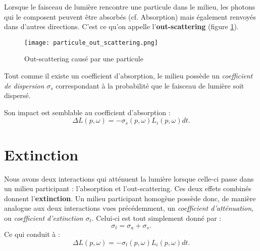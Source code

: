 Lorsque le faisceau de lumière rencontre une particule dans le milieu, les photons qui le composent peuvent être absorbés (cf. Absorption) mais également renvoyés dans d'autres directions. C'est ce qu'on appelle l'\textbf{out-scattering} (figure \ref{fig:out_scattering}).

\begin{figure}[h!]\label{fig:out_scattering}
\centering
\texttt{[image: particule\_out\_scattering.png]}
\caption{Out-scattering causé par une particule}
\end{figure}

Tout comme il existe un coefficient d'absorption, le milieu possède un \textit{coefficient de dispersion} $\sigma_{s}$ correspondant à la probabilité que le faisceau de lumière soit dispersé.

Son impact est semblable au coefficient d'absorption :
\large \begin{equation}
    \Delta L(p, \omega) = -\sigma_{s}(p, \omega)L_{i}(p, \omega)dt
.\end{equation} \normalsize

\section{Extinction}

Nous avons deux interactions qui atténuent la lumière lorsque celle-ci passe dans un milieu participant : l'absorption et l'out-scattering. Ces deux effets combinés donnent l'\textbf{extinction}. Un milieu participant homogène possède donc, de manière analogue aux deux interactions vues précédemment, un \textit{coefficient d'atténuation}, ou \textit{coefficient d'extinction} $\sigma_{t}$. Celui-ci est tout simplement donné par :
\large
$$\sigma_{t} = \sigma_{a} + \sigma_{s}.$$
\normalsize
Ce qui conduit à :
\large \begin{equation}
    \Delta L(p, \omega) = -\sigma_{t}(p, \omega)L_{i}(p, \omega)dt
.\end{equation} \normalsize \newline\par

